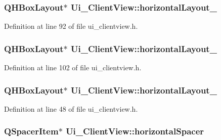 \subsubsection[{horizontal\+Layout\+\_\+5}]{\setlength{\rightskip}{0pt plus 5cm}Q\+H\+Box\+Layout$\ast$ Ui\+\_\+\+Client\+View\+::horizontal\+Layout\+\_}\label{class_ui___client_view_a320d512fe1c190255fadb042dee71aa8}


Definition at line 92 of file ui\+\_\+clientview.\+h.

\hypertarget{class_ui___client_view_a81b9b206b81d2461f04caf90f510fd1b}{}
\subsubsection[{horizontal\+Layout\+\_\+6}]{\setlength{\rightskip}{0pt plus 5cm}Q\+H\+Box\+Layout$\ast$ Ui\+\_\+\+Client\+View\+::horizontal\+Layout\+\_}\label{class_ui___client_view_a81b9b206b81d2461f04caf90f510fd1b}


Definition at line 102 of file ui\+\_\+clientview.\+h.

\hypertarget{class_ui___client_view_a5fdaa4f48ef9495d00ac91916fdeeb82}{}
\subsubsection[{horizontal\+Layout\+\_\+7}]{\setlength{\rightskip}{0pt plus 5cm}Q\+H\+Box\+Layout$\ast$ Ui\+\_\+\+Client\+View\+::horizontal\+Layout\+\_}\label{class_ui___client_view_a5fdaa4f48ef9495d00ac91916fdeeb82}


Definition at line 48 of file ui\+\_\+clientview.\+h.

\hypertarget{class_ui___client_view_aa7dcb0d8ab4f0405994e9e0fa7e989c2}{}
\subsubsection[{horizontal\+Spacer}]{\setlength{\rightskip}{0pt plus 5cm}Q\+Spacer\+Item$\ast$ Ui\+\_\+\+Client\+View\+::horizontal\+Spacer}\label{class_ui___client_view_aa7dcb0d8ab4f0405994e9e0fa7e989c2}


